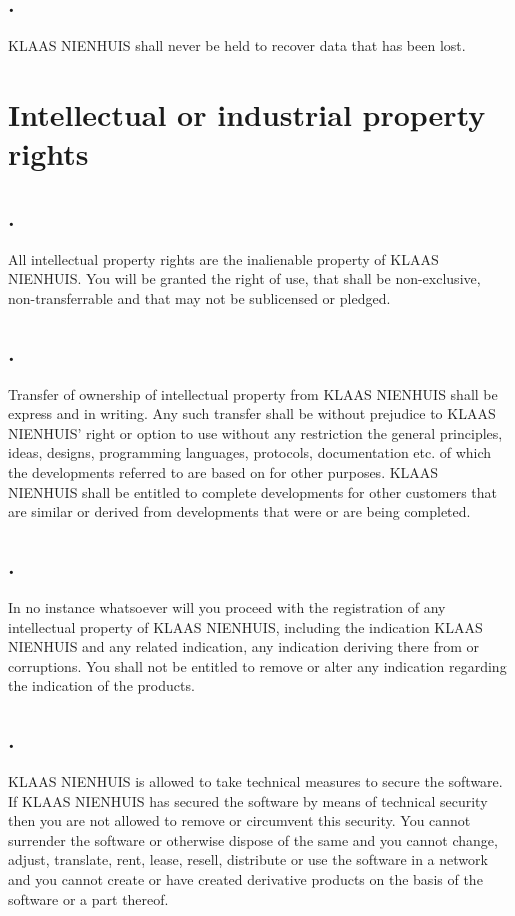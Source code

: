 \documentclass[letterpaper,10pt,english]{sphinxmanual}
\begin{document}
\section{.}
\label{Liability:id5}
KLAAS NIENHUIS shall never be held to recover data that has been lost.


\chapter{Intellectual or industrial property rights}
\label{Rights:intellectual-or-industrial-property-rights}\label{Rights::doc}

\section{.}
\label{Rights:id1}
All intellectual property rights are the inalienable property of KLAAS NIENHUIS. You will be granted the right of use, that shall be non-exclusive, non-transferrable and that may not be sublicensed or pledged.


\section{.}
\label{Rights:id2}
Transfer of ownership of intellectual property from KLAAS NIENHUIS shall be express and in writing. Any such transfer shall be without prejudice to KLAAS NIENHUIS’ right or option to use without any restriction the general principles, ideas, designs, programming languages, protocols, documentation etc. of which the developments referred to are based on for other purposes. KLAAS NIENHUIS shall be entitled to complete developments for other customers that are similar or derived from developments that were or are being completed.


\section{.}
\label{Rights:id3}
In no instance whatsoever will you proceed with the registration of any intellectual property of KLAAS NIENHUIS, including the indication KLAAS NIENHUIS and any related indication, any indication deriving there from or corruptions. You shall not be entitled to remove or alter any indication regarding the indication of the products.


\section{.}
\label{Rights:id4}
KLAAS NIENHUIS is allowed to take technical measures to secure the software. If KLAAS NIENHUIS has secured the software by means of technical security then you are not allowed to remove or circumvent this security. You cannot surrender the software or otherwise dispose of the same and you cannot change, adjust, translate, rent, lease, resell, distribute or use the software in a network and you cannot create or have created derivative products on the basis of the software or a part thereof.
\end{document}
